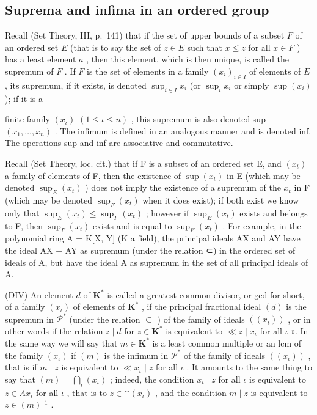 \subsection{Suprema and infima in an ordered group}

Recall (Set Theory, III, p.~141) that if the set of upper bounds of a subset \(F\) of an ordered set \(E\) (that is to say the set of \(z \in E\) such that \(x \leqslant z\) for all \(x \in F\) ) has a least element \(a\) , then this element, which is then unique, is called the supremum of \(F\) . If \(F\) is the set of elements in a family \((x_{i})_{i \in I}\) of elements of \(E\) , its supremum, if it exists, is denoted \(\sup_{i \in I} x_i\) (or \(\sup_{i} x_i\) or simply \(\sup(x_i)\) ); if it is a

finite family \((x_{\iota})\) \((1 \leqslant \iota \leqslant n)\) , this supremum is also denoted sup \((x_{1}, \ldots, x_{n})\) . The infimum is defined in an analogous manner and is denoted inf. The operations sup and inf are associative and commutative.

Recall (Set Theory, loc. cit.) that if F is a subset of an ordered set E, and \((x_{t})\) a family of elements of F, then the existence of \(\sup(x_{t})\) in E (which may be denoted \(\sup_{E}(x_{t})\) ) does not imply the existence of a supremum of the \(x_{t}\) in F (which may be denoted \(\sup_{F}(x_{t})\) when it does exist); if both exist we know only that \(\sup_{E}(x_{t}) \leqslant \sup_{F}(x_{t})\) ; however if \(\sup_{E}(x_{t})\) exists and belongs to F, then \(\sup_{F}(x_{t})\) exists and is equal to \(\sup_{E}(x_{t})\) . For example, in the polynomial ring A = K{[}X, Y{]} (K a field), the principal ideals AX and AY have the ideal AX + AY as supremum (under the relation ⊂) in the ordered set of ideals of A, but have the ideal A as supremum in the set of all principal ideals of A.

(DIV) An element \(d\) of \(\mathbf{K}^*\) is called a greatest common divisor, or gcd for short, of a family \((x_{\iota})\) of elements of \(\mathbf{K}^*\) , if the principal fractional ideal \((d)\) is the supremum in \(\mathcal{P}^*\) (under the relation \(\subset\) ) of the family of ideals \(((x_{\iota}))\) , or in other words if the relation \(z \mid d\) for \(z \in \mathbf{K}^*\) is equivalent to \(\ll z \mid x_{\iota}\) for all \(\iota\) ». In the same way we will say that \(m \in \mathbf{K}^*\) is a least common multiple or an lcm of the family \((x_{\iota})\) if \((m)\) is the infimum in \(\mathcal{P}^*\) of the family of ideals \(((x_{\iota}))\) , that is if \(m \mid z\) is equivalent to \(\ll x_{\iota} \mid z\) for all \(\iota\) . It amounts to the same thing to say that \((m) = \bigcap_{\iota} (x_{\iota})\) ; indeed, the condition \(x_{\iota} \mid z\) for all \(\iota\) is equivalent to \(z \in Ax_{\iota}\) for all
\(\iota\) , that is to \(z \in \cap (x_{\iota})\) , and the condition \(m \mid z\) is equivalent to \(z \in (m)\) \(^{1}\) .

